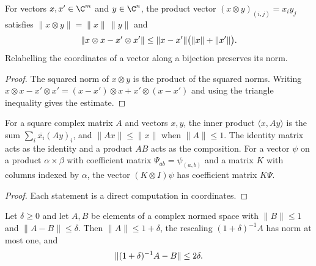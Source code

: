 \begin{lemma}
    \label{lem:kronecker_vectors}
    \leanok
    For vectors $x,x'\in\C^m$ and $y\in\C^n$, the product vector
    $(x\otimes y)_{(i,j)}=x_iy_j$ satisfies
    $\lVert x\otimes y\rVert=\lVert x\rVert\,\lVert y\rVert$ and
    \begin{align}
        \lVert x\otimes x-x'\otimes x'\rVert
        \le\lVert x-x'\rVert\bigl(\lVert x\rVert+\lVert x'\rVert\bigr).
        \notag
    \end{align}
    Relabelling the coordinates of a vector along a bijection preserves its
    norm.
\end{lemma}

\begin{proof}\leanok
    The squared norm of $x\otimes y$ is the product of the squared norms.
    Writing $x\otimes x-x'\otimes x'=(x-x')\otimes x+x'\otimes(x-x')$ and using
    the triangle inequality gives the estimate.
\end{proof}

\begin{lemma}
    \label{lem:matrix_euclidean_action}
    \leanok
    For a square complex matrix $A$ and vectors $x,y$, the inner product
    $\langle x,Ay\rangle$ is the sum $\sum_i\overline{x_i}(Ay)_i$, and
    $\lVert Ax\rVert\le\lVert x\rVert$ when $\lVert A\rVert\le1$. The identity
    matrix acts as the identity and a product $AB$ acts as the composition.
    For a vector $\psi$ on a product $\alpha\times\beta$ with coefficient
    matrix $\Psi_{ab}=\psi_{(a,b)}$ and a matrix $K$ with columns indexed by
    $\alpha$, the vector $(K\otimes I)\psi$ has coefficient matrix $K\Psi$.
\end{lemma}

\begin{proof}\leanok
    Each statement is a direct computation in coordinates.
\end{proof}

\begin{lemma}
    \label{lem:rescaled_contraction}
    \leanok
    Let $\delta\ge0$ and let $A,B$ be elements of a complex normed space with
    $\lVert B\rVert\le1$ and $\lVert A-B\rVert\le\delta$. Then
    $\lVert A\rVert\le1+\delta$, the rescaling $(1+\delta)^{-1}A$ has norm at
    most one, and
    \begin{align}
        \lVert(1+\delta)^{-1}A-B\rVert\le2\delta.
        \notag
    \end{align}
\end{lemma}

